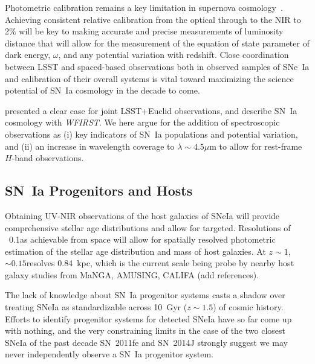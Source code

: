 \documentclass[12pt,preprint]{aastex}
\newcommand{\snia}{SN~Ia\xspace}
\newcommand{\sneia}{SNe~Ia\xspace}
\newcommand{\tbd}{{\color{red}}}
\begin{document}
Photometric calibration remains a key limitation in supernova cosmology~\citep{Scolnic18}.  Achieving consistent relative calibration from the optical through to the NIR to 2\% will be key to making accurate and precise measurements of luminosity distance that will allow for the measurement of the equation of state parameter of dark energy, $\omega$, and any potential variation with redshift.  Close coordination between LSST and spaced-based observations both in observed samples of \sneia and calibration of their overall systems is vital toward maximizing the science potential of SN~Ia cosmology in the decade to come.

\citet{Astier14} presented a clear case for joint LSST+Euclid observations, and \citet{Spergel15,Hounsell18} describe \snia cosmology with {\it WFIRST}.  We here argue for the addition of spectroscopic observations as (i) key indicators of SN~Ia populations and potential variation, and (ii) an increase in wavelength coverage to $\lambda\sim4.5\mu$m to allow for rest-frame $H$-band observations.

\subsection{\snia Progenitors and Hosts}

Obtaining UV-NIR observations of the host galaxies of SNeIa will provide comprehensive stellar age distributions and allow for targeted.  Resolutions of ~0.1\arcsec as achievable from space will allow for spatially resolved photometric estimation of the stellar age distribution and mass of host galaxies.  At $z\sim1$, $\sim0.15$\arcsec resolves 0.84~kpc, which is the current scale being probe by nearby host galaxy studies from MaNGA, AMUSING, CALIFA ({\tbd add references}).


The lack of knowledge about SN~Ia progenitor systems casts a shadow over treating SNeIa as standardizable across 10~Gyr ($z\sim1.5$) of cosmic history.  Efforts to identify progenitor systems for detected SNeIa have so far come up with nothing, and the very constraining limits in the case of the two closest SNeIa of the past decade SN~2011fe \citep{Li11,Bloom12} and SN~2014J \citep{Nielsen14, Perez-Torres14, Goobar15, Sand16, Graur19} strongly suggest we may never independently observe a \snia progenitor system.
\end{document}
